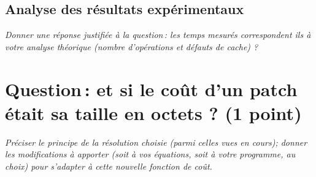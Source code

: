 \documentclass[a4paper, 10pt, french]{article}
\begin{document}
\subsection{Analyse des résultats expérimentaux}
{\em Donner  une réponse justifiée  à la question\,: 
              les  temps mesurés correspondent ils  à votre analyse théorique (nombre d’opérations et défauts de cache) ?
}

\section{Question\,: et  si le coût d'un patch était sa taille en octets ? (1 point)}
{\em Préciser le principe de la résolution choisie (parmi celles vues en cours); donner  les modifications à apporter (soit à vos  équations, soit à votre programme, au choix) 
pour s'adapter à cette nouvelle fonction de coût. 
}
\end{document}
